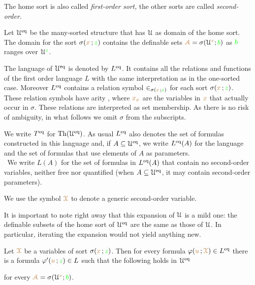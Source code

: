 The home sort is also called \emph{first-order sort,}
the other sorts are called \emph{second-order.}

Let \emph{$\EuScript U^{{{\rm eq}}}$\/} be the many-sorted structure that has $\EuScript U$ as domain of the home sort.
The domain for the sort $\sigma({\color{brown} x}\,;{\color{green} z})$ contains 
the definable sets ${\color{brown}\EuScript A}=\sigma(\EuScript U^{\color{brown} x};{\color{green} b})$ as ${\color{green} b}$ ranges over $\EuScript U^{\color{green} z}$.

The language of $\EuScript U^{{\rm eq}}$ is denoted by $L^{{\rm eq}}$.
It contains all the relations and functions of the first order language $L$ with the same interpretation as in the one-sorted case.  
Moreover $L^{{\rm eq}}$ contains a relation symbol $\in_{\sigma({\color{brown} x}\,;{\color{green} z})}$ for each sort $\sigma({\color{brown} x}\,;{\color{green} z})$.
These relation symbols have arity , where ${\color{brown} x_\sigma}$ are the variables in ${\color{brown} x}$ that actually occur in $\sigma$.
These relations are interpreted as set membership.
As there is no risk of ambiguity, in what follows we omit $\sigma$ from the subscripts.

We write \emph{$T^{{{\rm eq}}}$\/} for ${\rm Th}(\EuScript U^{{\rm eq}})$.
As usual \emph{$L^{{\rm eq}}$\/} also denotes the set of formulas constructed in this language and, if $A\subseteq\EuScript U^{{\rm eq}}$, we write  \emph{$L^{{\rm eq}}(A)$\/} for the language and the set of formulas that use elements of $A$ as parameters.
\\\
\noindent\llap{\textcolor{red}{\Large\warning}\kern1.5ex}We write \emph{$L(A)$\/} for the set of formulas in $L^{{\rm eq}}(A)$ that contain no second-order variables, neither free nor quantified (when $A\subseteq\EuScript U^{{\rm eq}}$, it may contain second-order parameters).

We use the symbol ${\color{brown}\EuScript X}$ to denote a generic second-order variable.


It is important to note right away that this expansion of $\EuScript U$ is a mild one: the definable subsets of the home sort of $\EuScript U^{{\rm eq}}$ are the same as those of $\EuScript U$.
In particular, iterating the expansion would not yield anything new.

\begin{proposition}\label{prop_eqmild}
Let ${\color{brown}\EuScript X}$ be a variables of sort $\sigma({\color{brown} x}\,;{\color{green} z})$.
Then for every formula $\varphi({\color{brown} u}\,;{\color{brown}\EuScript X})\in L^{{\rm eq}}$ there is a formula $\varphi'({\color{brown} u}\,;{\color{green} z})\in L$ such that the following holds in $\EuScript U^{{\rm eq}}$\smallskip

\smallskip

for every ${\color{brown}\EuScript A}=\sigma(\EuScript U^{\color{brown} x};{\color{green} b})$.

\end{proposition}

